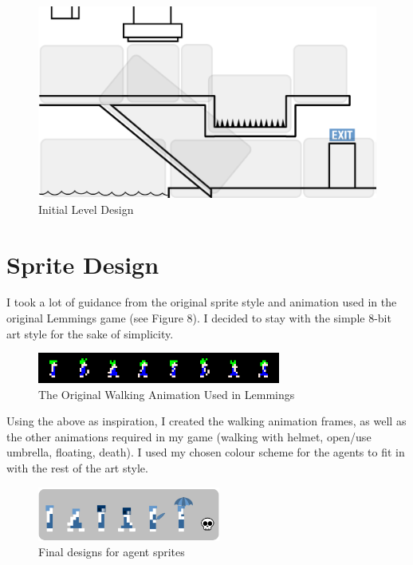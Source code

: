\documentclass[a4paper,oneside]{report}
\begin{document}
\begin{figure}[h!]
  \centering
    \includegraphics[width=120mm]{sources/images/LevelDesign}
    \caption{Initial Level Design}
\end{figure}
	
\section{Sprite Design}
		
I took a lot of guidance from the original sprite style and animation used in the original Lemmings game (see Figure 8). I decided to stay with the simple 8-bit art style for the sake of simplicity.
	
\begin{figure}[h!]
  \centering
    \includegraphics[width=80mm]{sources/images/lemmings-walker-sprites}
    \caption{The Original Walking Animation Used in Lemmings}
\end{figure}
		
Using the above as inspiration, I created the walking animation frames, as well as the other animations required in my game (walking with helmet, open/use umbrella, floating, death). I used my chosen colour scheme for the agents to fit in with the rest of the art style.
		
\begin{figure}[h!]
  \centering
    \includegraphics[width=60mm]{sources/images/Final}
    \caption{Final designs for agent sprites}
\end{figure}
\end{document}

